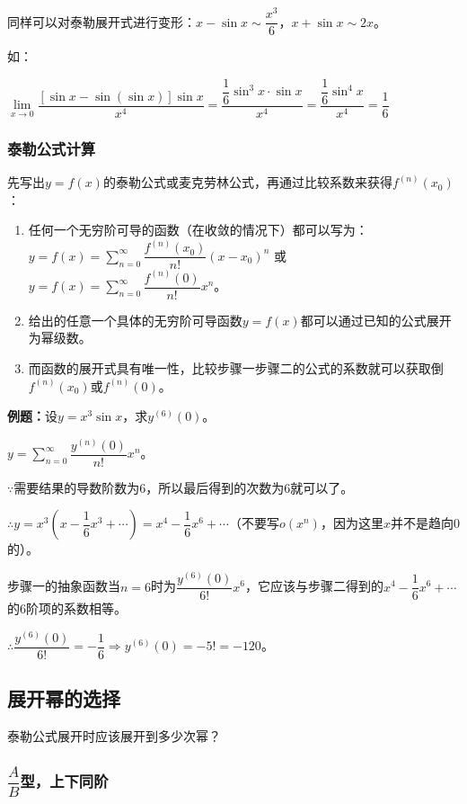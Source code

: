 \documentclass[UTF8, 12pt]{ctexart}
\begin{document}
同样可以对泰勒展开式进行变形：$x-\sin x\sim\dfrac{x^3}{6}$，$x+\sin x\sim 2x$。

如：

$\lim\limits_{x\to 0}\dfrac{[\sin x-\sin(\sin x)]\sin x}{x^4}=\dfrac{\dfrac{1}{6}\sin^3x\cdot\sin x}{x^4}=\dfrac{\dfrac{1}{6}\sin^4x}{x^4}=\dfrac{1}{6}$

\subsubsection{泰勒公式计算}

先写出$y=f(x)$的泰勒公式或麦克劳林公式，再通过比较系数来获得$f^{(n)}(x_0)$：

\begin{enumerate}
    \item 任何一个无穷阶可导的函数（在收敛的情况下）都可以写为： \medskip \\
    $y=f(x)=\sum_{n=0}^\infty\dfrac{f^{(n)}(x_0)}{n!}(x-x_0)^n$ 或 $y=f(x)=\sum_{n=0}^\infty\dfrac{f^{(n)}(0)}{n!}x^n$。
    \item 给出的任意一个具体的无穷阶可导函数$y=f(x)$都可以通过已知的公式展开为幂级数。
    \item 而函数的展开式具有唯一性，比较步骤一步骤二的公式的系数就可以获取倒$f^{(n)}(x_0)$或$f^{(n)}(0)$。
\end{enumerate}

\textbf{例题：}设$y=x^3\sin x$，求$y^{(6)}(0)$。\medskip

$y=\sum_{n=0}^\infty\dfrac{y^{(n)}(0)}{n!}x^n$。\medskip

$\because$需要结果的导数阶数为6，所以最后得到的次数为6就可以了。\medskip

$\therefore y=x^3\left(x-\dfrac{1}{6}x^3+\cdots\right)=x^4-\dfrac{1}{6}x^6+\cdots$（不要写$o(x^n)$，因为这里$x$并不是趋向0的）。

步骤一的抽象函数当$n=6$时为$\dfrac{y^{(6)}(0)}{6!}x^6$，它应该与步骤二得到的$x^4-\dfrac{1}{6}x^6+\cdots$的6阶项的系数相等。

$\therefore \dfrac{y^{(6)}(0)}{6!}=-\dfrac{1}{6}\Rightarrow y^{(6)}(0)=-5!=-120$。

\subsection{展开幂的选择}

泰勒公式展开时应该展开到多少次幂？

\subsubsection{\texorpdfstring{$\dfrac{A}{B}$}\ 型，上下同阶}
\end{document}
